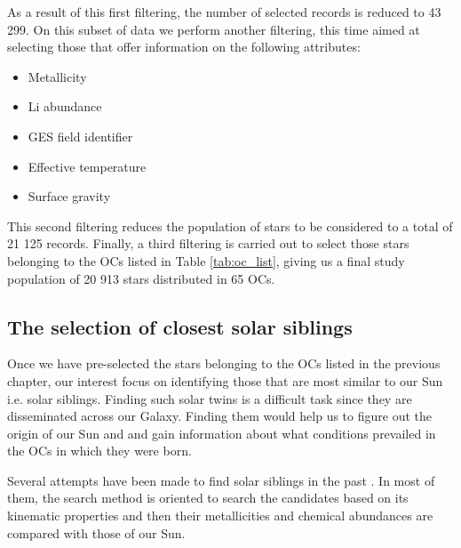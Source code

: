 \documentclass[fleqn,usenatbib]{mnras}
\begin{document}
As a result of this first filtering, the number of selected records is reduced to 43 299. On this subset of data we perform another filtering, this time aimed at selecting those that offer information on the following attributes:
\begin{itemize}
    \item Metallicity
    \item Li abundance
    \item GES field identifier
    \item Effective temperature
    \item Surface gravity
\end{itemize}

This second filtering reduces the population of stars to be considered to a total of 21 125 records. Finally, a third filtering is carried out to select those stars belonging to the OCs listed in Table \ref{tab:oc_list}, giving us a final study population of 20 913 stars distributed in 65 OCs.\par

\subsection{The selection of closest solar siblings}
Once we have pre-selected the stars belonging to the OCs listed in the previous chapter, our interest focus on identifying those that are most similar to our Sun i.e. solar siblings. Finding such solar twins is a difficult task since they are disseminated across our Galaxy. Finding them would help us to figure out the origin of our Sun and and gain information about what conditions prevailed in the OCs in which they were born.\par

Several attempts have been made to find solar siblings in the past \citep[see][and references therein]{Adibekyan2018}. In most of them, the search method is oriented to search the candidates based on its kinematic properties and then their metallicities and chemical abundances are compared with those of our Sun.\par
\end{document}
